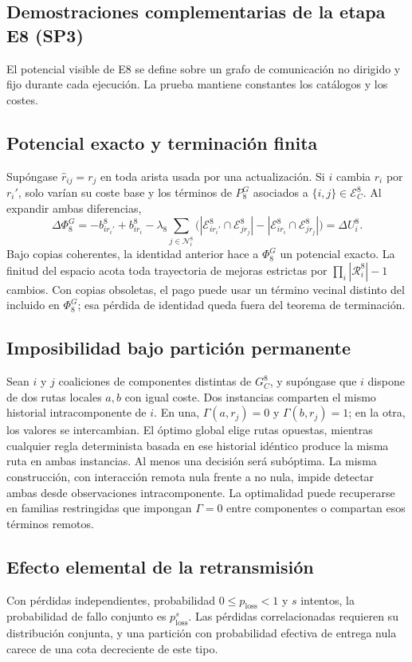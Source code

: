 \subsection{Demostraciones complementarias de la etapa E8 (SP3)}
\label{app:sp8-proofs}

El potencial visible de E8 se define sobre un grafo de comunicación no dirigido y fijo durante cada ejecución. La prueba mantiene constantes los catálogos y los costes.

\subsection{Potencial exacto y terminación finita}

Supóngase $\widehat r_{ij}=r_j$ en toda arista usada por una actualización. Si $i$ cambia $r_i$ por $r_i'$, solo varían su coste base y los términos de $P_8^G$ asociados a $\{i,j\}\in\mathcal E_C^8$. Al expandir ambas diferencias,
\[
 \Delta\Phi_8^G=-b_{ir_i'}^8+b_{ir_i}^8
 -\lambda_8\sum_{j\in\mathcal N_i^8}
 \bigl(|\mathcal E_{ir_i'}^8\cap\mathcal E_{jr_j}^8|-|\mathcal E_{ir_i}^8\cap\mathcal E_{jr_j}^8|\bigr)=\Delta U_i^8.
\]
Bajo copias coherentes, la identidad anterior hace a \(\Phi_8^G\) un potencial exacto. La finitud del espacio acota toda trayectoria de mejoras estrictas por \(\prod_i|\mathcal R_i^8|-1\) cambios. Con copias obsoletas, el pago puede usar un término vecinal distinto del incluido en \(\Phi_8^G\); esa pérdida de identidad queda fuera del teorema de terminación.

\subsection{Imposibilidad bajo partición permanente}

Sean $i$ y $j$ coaliciones de componentes distintas de $G_C^8$, y supóngase que \(i\) dispone de dos rutas locales \(a,b\) con igual coste. Dos instancias comparten el mismo historial intracomponente de \(i\). En una, \(\Gamma(a,r_j)=0\) y \(\Gamma(b,r_j)=1\); en la otra, los valores se intercambian. El óptimo global elige rutas opuestas, mientras cualquier regla determinista basada en ese historial idéntico produce la misma ruta en ambas instancias. Al menos una decisión será subóptima. La misma construcción, con interacción remota nula frente a no nula, impide detectar ambas desde observaciones intracomponente. La optimalidad puede recuperarse en familias restringidas que impongan \(\Gamma=0\) entre componentes o compartan esos términos remotos.

\subsection{Efecto elemental de la retransmisión}

Con pérdidas independientes, probabilidad \(0\leq p_{\mathrm{loss}}<1\) y \(s\) intentos, la probabilidad de fallo conjunto es \(p_{\mathrm{loss}}^s\). Las pérdidas correlacionadas requieren su distribución conjunta, y una partición con probabilidad efectiva de entrega nula carece de una cota decreciente de este tipo.
